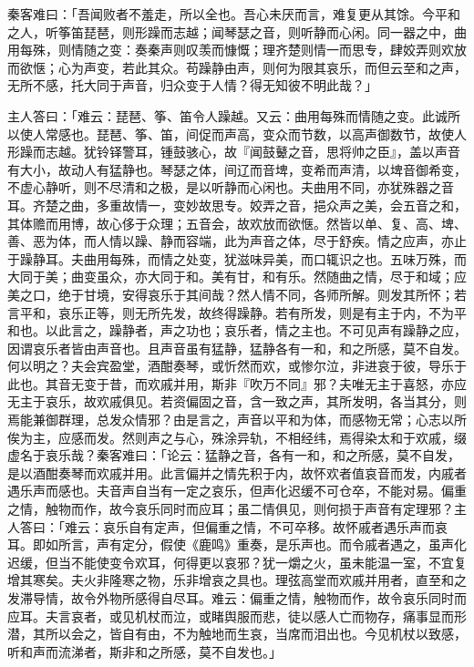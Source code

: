 \documentclass[UTF8,titlepage,oneside]{ctexbook}
\begin{document}
秦客难曰：「吾闻败者不羞走，所以全也。吾心未厌而言，难复更从其馀。今平和之人，听筝笛琵琶，则形躁而志越；闻琴瑟之音，则听静而心闲。同一器之中，曲用每殊，则情随之变：奏秦声则叹羡而慷慨；理齐楚则情一而思专，肆姣弄则欢放而欲惬；心为声变，若此其众。苟躁静由声，则何为限其哀乐，而但云至和之声，无所不感，托大同于声音，归众变于人情？得无知彼不明此哉？」


主人答曰：「难云：琵琶、筝、笛令人躁越。又云：曲用每殊而情随之变。此诚所以使人常感也。琵琶、筝、笛，间促而声高，变众而节数，以高声御数节，故使人形躁而志越。犹铃铎警耳，锺鼓骇心，故『闻鼓鼙之音，思将帅之臣』，盖以声音有大小，故动人有猛静也。琴瑟之体，间辽而音埤，变希而声清，以埤音御希变，不虚心静听，则不尽清和之极，是以听静而心闲也。夫曲用不同，亦犹殊器之音耳。齐楚之曲，多重故情一，变妙故思专。姣弄之音，挹众声之美，会五音之和，其体赡而用博，故心侈于众理；五音会，故欢放而欲惬。然皆以单、复、高、埤、善、恶为体，而人情以躁、静而容端，此为声音之体，尽于舒疾。情之应声，亦止于躁静耳。夫曲用每殊，而情之处变，犹滋味异美，而口辄识之也。五味万殊，而大同于美；曲变虽众，亦大同于和。美有甘，和有乐。然随曲之情，尽于和域；应美之口，绝于甘境，安得哀乐于其间哉？然人情不同，各师所解。则发其所怀；若言平和，哀乐正等，则无所先发，故终得躁静。若有所发，则是有主于内，不为平和也。以此言之，躁静者，声之功也；哀乐者，情之主也。不可见声有躁静之应，因谓哀乐者皆由声音也。且声音虽有猛静，猛静各有一和，和之所感，莫不自发。何以明之？夫会宾盈堂，酒酣奏琴，或忻然而欢，或惨尔泣，非进哀于彼，导乐于此也。其音无变于昔，而欢戚并用，斯非『吹万不同』邪？夫唯无主于喜怒，亦应无主于哀乐，故欢戚俱见。若资偏固之音，含一致之声，其所发明，各当其分，则焉能兼御群理，总发众情邪？由是言之，声音以平和为体，而感物无常；心志以所俟为主，应感而发。然则声之与心，殊涂异轨，不相经纬，焉得染太和于欢戚，缀虚名于哀乐哉？秦客难曰：「论云：猛静之音，各有一和，和之所感，莫不自发，是以酒酣奏琴而欢戚并用。此言偏并之情先积于内，故怀欢者值哀音而发，内戚者遇乐声而感也。夫音声自当有一定之哀乐，但声化迟缓不可仓卒，不能对易。偏重之情，触物而作，故今哀乐同时而应耳；虽二情俱见，则何损于声音有定理邪？主人答曰：「难云：哀乐自有定声，但偏重之情，不可卒移。故怀戚者遇乐声而哀耳。即如所言，声有定分，假使《鹿鸣》重奏，是乐声也。而令戚者遇之，虽声化迟缓，但当不能使变令欢耳，何得更以哀邪？犹一爝之火，虽未能温一室，不宜复增其寒矣。夫火非隆寒之物，乐非增哀之具也。理弦高堂而欢戚并用者，直至和之发滞导情，故令外物所感得自尽耳。难云：偏重之情，触物而作，故令哀乐同时而应耳。夫言哀者，或见机杖而泣，或睹舆服而悲，徒以感人亡而物存，痛事显而形潜，其所以会之，皆自有由，不为触地而生哀，当席而泪出也。今见机杖以致感，听和声而流涕者，斯非和之所感，莫不自发也。」
\end{document}
